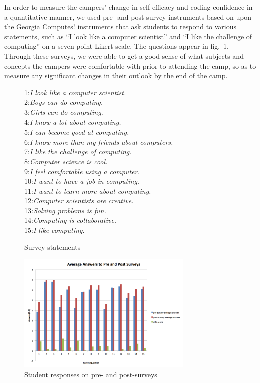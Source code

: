 In order to measure the campers' change in self-efficacy and coding
confidence in a quantitative manner, we used pre- and post-survey
instruments based on upon the Georgia Computes! instruments
\cite{Bruckman2009} that ask students to respond to various statements,
such as ``I look like a computer scientist'' and ``I like the
challenge of computing'' on a seven-point Likert scale.  The questions
appear in fig.~1.  Through these surveys, we were able to get a
good sense of what subjects and concepts the campers were comfortable
with prior to attending the camp, so as to measure any significant
changes in their outlook by the end of the camp.  

\begin{figure}
{\small
1:\textit{I look like a computer scientist.} \\
2:\textit{Boys can do computing.} \\
3:\textit{Girls can do computing.} \\
4:\textit{I know a lot about computing.} \\
5:\textit{I can become good at computing.} \\
6:\textit{I know more than my friends about computers.} \\
7:\textit{I like the challenge of computing.} \\
8:\textit{Computer science is cool.} \\
9:\textit{I feel comfortable using a computer.} \\
10:\textit{I want to have a job in computing.} \\
11:\textit{I want to learn more about computing.} \\
12:\textit{Computer scientists are creative.} \\
13:\textit{Solving problems is fun.} \\
14:\textit{Computing is collaborative.} \\
15:\textit{I like computing.} 
}
\caption{Survey statements}
\end{figure}

\begin{figure}
\includegraphics[width=3.3in]{images/AvgAnswersAll}
\caption{Student responses on pre- and post-surveys}
\end{figure}

